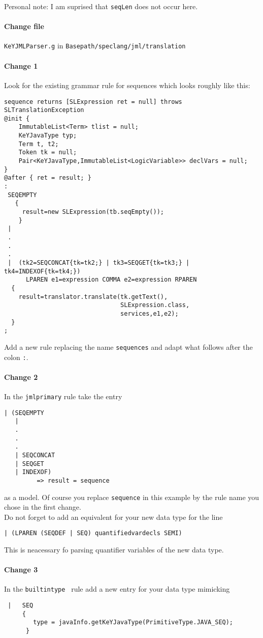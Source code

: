 \documentclass[11pt]{article}
\begin{document}
Personal note: I am suprised that \verb+seqLen+ does not occur here.
\paragraph{Change file}  \verb+KeYJMLParser.g+ in \verb+Basepath/speclang/jml/translation+\\
\paragraph{\quad Change 1}
Look for the existing grammar rule for sequences which looks roughly like this:
\begin{verbatim}
sequence returns [SLExpression ret = null] throws SLTranslationException
@init {
    ImmutableList<Term> tlist = null;
    KeYJavaType typ;
    Term t, t2;
    Token tk = null;
    Pair<KeYJavaType,ImmutableList<LogicVariable>> declVars = null;
}
@after { ret = result; }
:
 SEQEMPTY
   {
     result=new SLExpression(tb.seqEmpty());
    }
 |  
 .
 .
 .        
 |  (tk2=SEQCONCAT{tk=tk2;} | tk3=SEQGET{tk=tk3;} | tk4=INDEXOF{tk=tk4;})
      LPAREN e1=expression COMMA e2=expression RPAREN
  {
    result=translator.translate(tk.getText(),
                                SLExpression.class,
                                services,e1,e2);
  }
;
\end{verbatim}
Add a new rule replacing the name \verb+sequences+ and adapt what follows after the colon \verb+:+.
\paragraph{\quad Change 2} In the \verb+jmlprimary+ rule take the entry
\begin{verbatim}
| (SEQEMPTY
   |
   .
   .
   .
   | SEQCONCAT
   | SEQGET
   | INDEXOF)
         => result = sequence    
\end{verbatim}
as a model. Of course you replace \verb+sequence+ in this example by the rule name you chose in the first change.
\\
Do not forget to  add an equivalent for your new data type for the line 
\begin{verbatim}
| (LPAREN (SEQDEF | SEQ) quantifiedvardecls SEMI)
\end{verbatim}
This is neacessary fo parsing quantifier variables of the new data type.
\paragraph{\quad Change 3} In the \verb+builtintype + rule add a new entry for your data type mimicking
\begin{verbatim}
 |   SEQ
     {
        type = javaInfo.getKeYJavaType(PrimitiveType.JAVA_SEQ);
      }
\end{verbatim}
\end{document}
